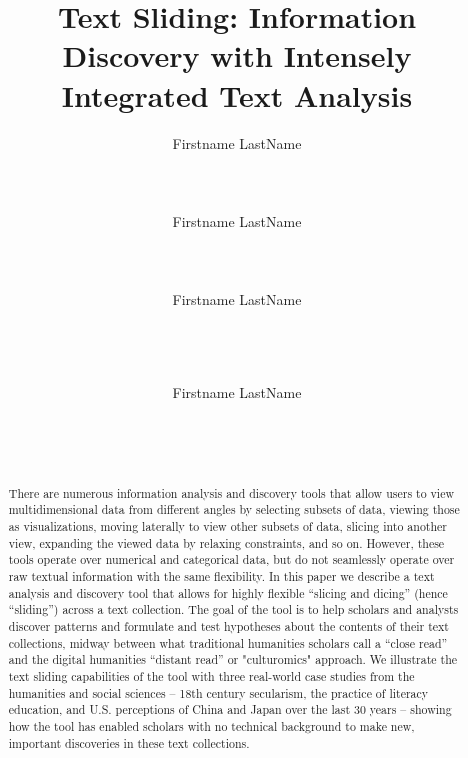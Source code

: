 \documentclass{sig-alternate}
\begin{document}
\title{Text Sliding: Information Discovery with Intensely Integrated Text Analysis}

\author{%
\alignauthor Firstname LastName\\
       \\
       \\
       \\
\alignauthor Firstname LastName\\
       \\
       \\
       \\
\alignauthor Firstname LastName\\
       \\
       \\
       \\
\and
\alignauthor Firstname LastName\\
       \\
       \\
       \\
}

\maketitle

\begin{abstract}
There are numerous information analysis and discovery tools that allow users to view multidimensional data from different angles by selecting subsets of data, viewing those as visualizations, moving laterally to view other subsets of data, slicing into another view, expanding the viewed data by relaxing constraints, and so on.  However, these tools operate over numerical and categorical data, but do not seamlessly operate over raw textual information with the same flexibility. In this paper we describe a text analysis and discovery tool that allows for highly flexible  ``slicing and dicing'' (hence  ``sliding'') across a text collection.  The goal of the tool is to help scholars and analysts discover patterns and formulate and test hypotheses about the contents of their text collections, midway between what traditional humanities scholars call a  ``close read'' and the digital humanities  ``distant read'' or "culturomics" approach.  We illustrate the text sliding capabilities of the tool with three real-world case studies from the humanities and social sciences -- 18th century secularism, the practice of literacy education, and U.S. perceptions of China and Japan over the last 30 years -- showing how the tool has enabled scholars with no technical background to make new, important discoveries in these text collections.

\end{abstract}
\end{document}
